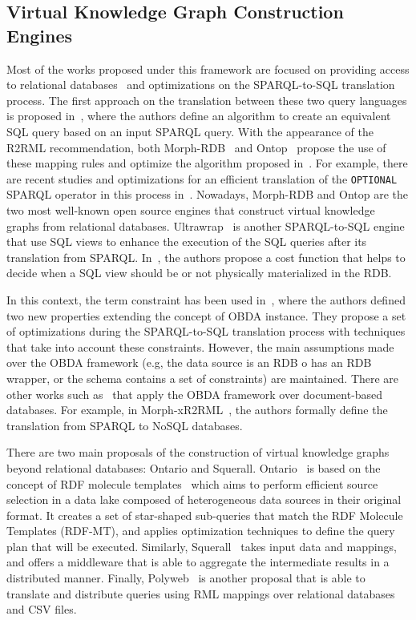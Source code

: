 \subsection{Virtual Knowledge Graph Construction Engines}
Most of the works proposed under this framework are focused on providing access to relational databases~\citep{priyatna2014formalisation,calvanese2017ontop,sequeda2013ultrawrap} and optimizations on the  SPARQL-to-SQL translation process. The first approach on the translation between these two query languages is proposed in~\citep{chebotko2009semantics}, where the authors define an algorithm to create an equivalent SQL query based on an input SPARQL query. With the appearance of the R2RML recommendation, both Morph-RDB~\citep{priyatna2014formalisation} and Ontop~\citep{calvanese2017ontop} propose the use of these mapping rules and optimize the algorithm proposed in~\citep{chebotko2009semantics}. For example, there are recent studies and optimizations for an efficient translation of the \texttt{OPTIONAL} SPARQL operator in this process in~\citep{xiao2018efficient}. Nowadays, Morph-RDB and Ontop are the two most well-known open source engines that construct virtual knowledge graphs from relational databases. Ultrawrap~\citep{sequeda2013ultrawrap,sequeda2014obda} is another SPARQL-to-SQL engine that use SQL views to enhance the execution of the SQL queries after its translation from SPARQL. In~\citep{sequeda2014obda}, the authors propose a cost function that helps to decide when a SQL view should be or not physically materialized in the RDB.

In this context, the term constraint has been used in~\citep{hovland2016obda}, where the authors defined two new properties extending the concept of OBDA instance. They propose a set of optimizations during the SPARQL-to-SQL translation process with techniques that take into account these constraints. However, the main assumptions made over the OBDA framework (e.g, the data source is an RDB o has an RDB wrapper, or the schema contains a set of constraints) are maintained. There are other works such as~\citep{michel2015translation,botoeva2019ontology} that apply the OBDA framework over document-based databases. For example, in Morph-xR2RML~\citep{michel2015translation}, the authors formally define the translation from SPARQL to NoSQL databases.

There are two main proposals of the construction of virtual knowledge graphs beyond relational databases: Ontario and Squerall. Ontario~\citep{endris2019ontario} is based on the concept of RDF molecule templates~\citep{endris2017mulder} which aims to perform efficient source selection in a data lake composed of heterogeneous data sources in their original format. It creates a set of star-shaped sub-queries that match the RDF Molecule Templates (RDF-MT), and applies optimization techniques to define the query plan that will be executed. Similarly, Squerall~\citep{mami2019querying} takes input data and mappings, and offers a middleware that is able to aggregate the intermediate results in a distributed manner. Finally, Polyweb~\citep{khan2019one} is another proposal that is able to translate and distribute queries using RML mappings over relational databases and CSV files.


